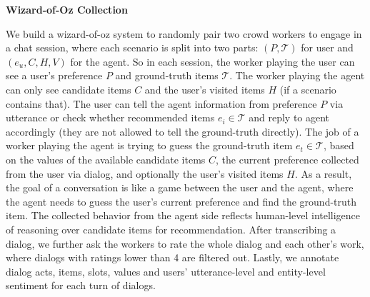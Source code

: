 \begin{table*}
    \centering
    \caption{Statistics of MGConvRex Dataset}     
\label{chap6:tbl:dataset}
\end{table*}

\textbf{Wizard-of-Oz Collection}
\label{chap6:sec:woz}

We build a wizard-of-oz system to randomly pair two crowd workers to engage in a chat session, where each scenario is split into two parts:
$(P, \mathcal{T})$ for user and $(e_u, C, H, V)$ for the agent.
So in each session, the worker playing the user can see a user's preference $P$ and ground-truth items $\mathcal{T}$. 
The worker playing the agent can only see candidate items $C$ and the user's visited items $H$ (if a scenario contains that).
The user can tell the agent information from preference $P$ via utterance or check whether recommended items $e_i \in \mathcal{T}$ and reply to agent accordingly (they are not allowed to tell the ground-truth directly). 
The job of a worker playing the agent is trying to guess the ground-truth item $e_t \in \mathcal{T}$, based on the values of the available candidate items $C$, the current preference collected from the user via dialog, and optionally the user's visited items $H$.
As a result, the goal of a conversation is like a game between the user and the agent, where the agent needs to guess the user's current preference and find the ground-truth item.
The collected behavior from the agent side reflects human-level intelligence of reasoning over candidate items for recommendation.
After transcribing a dialog, we further ask the workers to rate the whole dialog and each other's work, where
dialogs with ratings lower than 4 are filtered out.
Lastly, we annotate dialog acts, items, slots, values and users' utterance-level and entity-level sentiment for each turn of dialogs.

